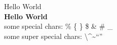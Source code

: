 \documentclass[oneside,final,14pt]{extreport}
\begin{document}
Hello World\\
\textbf{Hello World}\\

some special chars: \% \{ \} \$ \& \# \_ \\
some super special chars: \textbackslash  \textasciicircum  \textasciitilde ``'' \\
\end{document}
